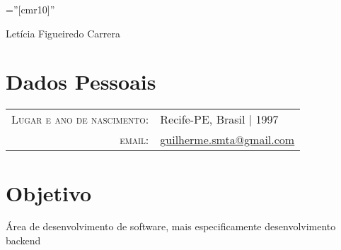 \documentclass[a4paper,10pt]{article}
\begin{document}

\pagestyle{empty} %

\font\fb=''[cmr10]'' %

\par{\centering
		{\Huge Letícia Figueiredo Carrera
	}\bigskip\par}

\section{Dados Pessoais}

\begin{tabular}{rl}
    \textsc{Lugar e ano de nascimento:} & Recife-PE, Brasil  | 1997 \\
    \textsc{email:}     &  \href{mailto:guilherme.smta@gmail.com}{guilherme.smta@gmail.com}
\end{tabular}

\section{Objetivo}
Área de desenvolvimento de software, mais especificamente desenvolvimento backend

\end{document}
